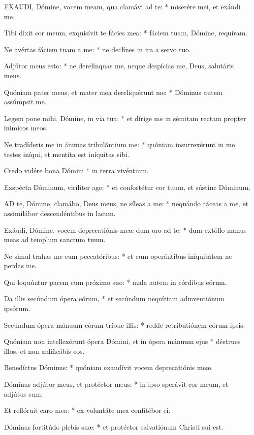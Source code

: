 
\lettrine[lines=2]{E}{XAUDI}, Dómine, vocem meam, qua clamávi ad te: * miserére mei, et exáudi me.

Tibi dixit cor meum, exquisívit te fácies mea: * fáciem tuam, Dómine, requíram.

Ne avértas fáciem tuam a me: * ne declínes in ira a servo tuo.

Adjútor meus esto: * ne derelínquas me, neque despícias me, Deus, salutáris meus.

Quóniam pater meus, et mater mea dereliquérunt me: * Dóminus autem assúmpsit me.

Legem pone mihi, Dómine, in via tua: * et dírige me in sémitam rectam propter inimícos meos.

Ne tradíderis me in ánimas tribulántium me: * quóniam insurrexérunt in me testes iníqui, et mentíta est iníquitas sibi.

Credo vidére bona Dómini * in terra vivéntium.

Exspécta Dóminum, viríliter age: * et confortétur cor tuum, et sústine Dóminum.


\lettrine[lines=2]{A}{D} te, Dómine, clamábo, Deus meus, ne síleas a me: * nequándo táceas a me, et assimilábor descendéntibus in lacum.

Exáudi, Dómine, vocem deprecatiónis meæ dum oro ad te: * dum extóllo manus meas ad templum sanctum tuum.

Ne simul trahas me cum peccatóribus: * et cum operántibus iniquitátem ne perdas me.

Qui loquúntur pacem cum próximo suo: * mala autem in córdibus eórum.

Da illis secúndum ópera eórum, * et secúndum nequítiam adinventiónum ipsórum.

Secúndum ópera mánuum eórum tríbue illis: * redde retributiónem eórum ipsis.

Quóniam non intellexérunt ópera Dómini, et in ópera mánuum ejus * déstrues illos, et non ædificábis eos.

Benedíctus Dóminus: * quóniam exaudívit vocem deprecatiónis meæ.

Dóminus adjútor meus, et protéctor meus: * in ipso sperávit cor meum, et adjútus sum.

Et reflóruit caro mea: * ex voluntáte mea confitébor ei.

Dóminus fortitúdo plebis suæ: * et protéctor salvatiónum Christi sui est.

